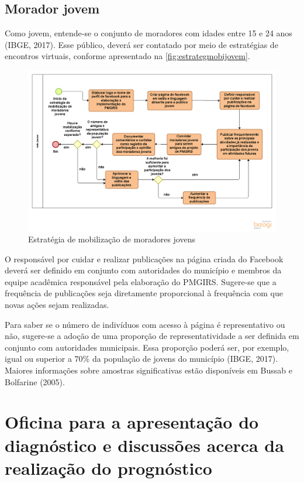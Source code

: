 \subsection{Morador jovem}

Como jovem, entende-se o conjunto de moradores com idades entre 15 e 24 anos (IBGE, 2017).  Esse público, deverá ser contatado por meio de estratégias de encontros virtuais, conforme apresentado na \autoref{fig:estrategmobijovem}.

\begin{figure}[h!]
	\centering
	\includegraphics[width=\linewidth]{produtos/produm/estrategmobijovem}
	\caption{Estratégia de mobilização de moradores jovens}
	\label{fig:estrategmobijovem}
\end{figure}

O responsável por cuidar e realizar publicações na página criada do Facebook deverá ser definido em conjunto com autoridades do município e membros da equipe acadêmica responsável pela elaboração do PMGIRS. Sugere-se que a frequência de publicações seja diretamente proporcional à frequência com que novas ações sejam realizadas.

Para saber se o número de indivíduos com acesso à página é representativo ou não, sugere-se a adoção de uma proporção de representatividade a ser definida em conjunto com autoridades municipais. Essa proporção poderá ser, por exemplo, igual ou superior a 70\% da população de jovens do município (IBGE, 2017). Maiores informações sobre amostras significativas estão disponíveis em Bussab e Bolfarine (2005).


\section{Oficina para a apresentação do diagnóstico e discussões acerca da realização do prognóstico}


